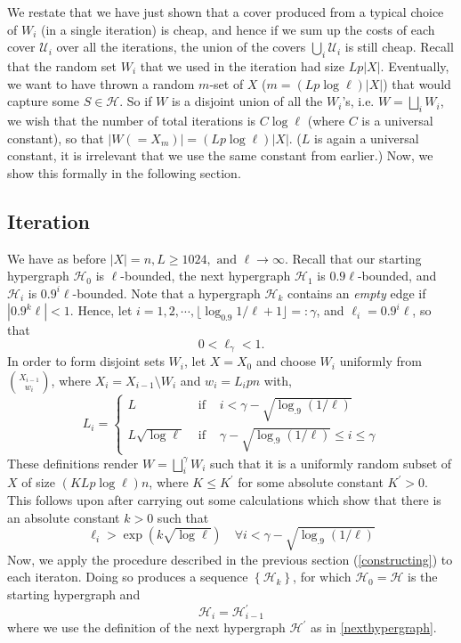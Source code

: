 \documentclass[12pt,oneside,reqno]{amsart}
\theoremstyle{definition}
\numberwithin{equation}{theorem}
\newcommand{\cH}{{\mathcal H}}
\newcommand{\cU}{{\mathcal U}}
\begin{document}
We restate that we have just shown that a cover produced from a typical choice of $W_i$ (in a single iteration) is cheap, and hence if we sum up the costs of each cover $\cU_i$ over all the iterations, the union of the covers $\bigcup_i \cU_i$ is still cheap.  Recall that the random set $W_i$ that we used in the iteration had size $Lp|X|$. Eventually, we want to have thrown a random $m$-set of $X$ ($m=(Lp\log{\ell})|X|$) that would capture some $S \in \cH$. So if $W$ is a disjoint union of all the $W_i$'s, i.e. $W = \bigsqcup_{i} W_{i}$, we wish that the number of total iterations is $C\log{\ell}$ (where $C$ is a universal constant), so that $|W(=X_m)| = (Lp\log{\ell})|X|$. ($L$ is again a universal constant, it is irrelevant that we use the same constant from earlier.) Now, we show this formally in the following section.

\subsection{Iteration}\label{iteration}
We have as before $|X|= n, L \geq 1024, \text{ and } \ell \rightarrow \infty$. Recall that our starting hypergraph $\cH_0$ is $\ell$-bounded, the next hypergraph $\cH_1$ is $0.9\ell$-bounded, and $\cH_i$ is $0.9^{i}\ell$-bounded. Note that a hypergraph $\cH_k$ contains an \emph{empty} edge if $|0.9^k \ell| < 1$. Hence, let $i = 1,2, \cdots, \lfloor{\log_{0.9}{1/\ell}+1}\rfloor =: \gamma$, and $\ell_i = 0.9^i\ell$, so that 
\begin{equation}\label{f}
0 < \ell_{\gamma} < 1.
\end{equation}
In order to form disjoint sets $W_i$, let $X = X_0$ and choose $W_i$ uniformly from $\binom{X_{i-1}}{w_i}$, where $X_i = X_{i-1}\setminus W_i$ and $w_{i}=L_{i} p n$ with, 
$$
L_{i}=\left\{\begin{array}{lll}
L & \text { if } & i<\gamma-\sqrt{\log _{.9}(1 / \ell)} \\
L \sqrt{\log \ell} & \text { if } & \gamma-\sqrt{\log _{.9}(1 / \ell)} \leq i \leq \gamma
\end{array}\right.
$$
These definitions render $W = \bigsqcup_{i}^{\gamma} W_{i}$ such that it is a uniformly random subset of $X$ of size $(K L p \log \ell) n$, where $K \leq K^{\prime}$ for some absolute constant $K^{\prime}>0$. This follows upon after carrying out some calculations which show that there is an absolute constant $k>0$ such that
\begin{equation}\label{expp}
\ell_{i}>\exp (k \sqrt{\log \ell}) \quad \forall i<\gamma-\sqrt{\log _{.9}(1 / \ell)}
\end{equation}
Now, we apply the procedure described in the previous section (\ref{constructing}) to each iteraton. Doing so produces a sequence $\left\{\cH_k \right\}$, for which $\cH_0 = \cH$ is the starting hypergraph and 
\begin{equation}
\cH_i = \cH_{i-1}^{\prime}
\end{equation}
where we use the definition of the next hypergraph $\cH^{\prime}$ as in \ref{nexthypergraph}.
\end{document}
